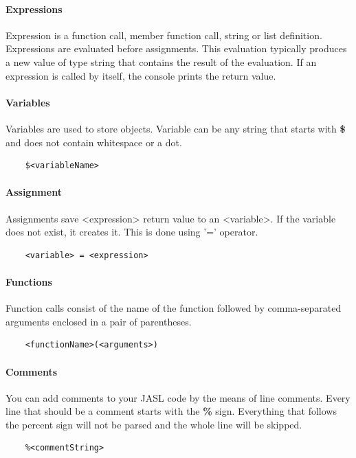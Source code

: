 \documentclass{ctuthesis}
\begin{document}
\paragraph{Expressions}
Expression is a function call, member function call, string or list definition. Expressions are evaluated before assignments. This evaluation typically produces a new value of type string that contains the result of the evaluation. If an expression is called by itself, the console prints the return value.

\paragraph{Variables}
Variables are used to store objects. Variable can be any string that starts with \textbf{\$} and does not contain whitespace or a dot.
\begin{verbatim}
	$<variableName>
\end{verbatim}

\paragraph{Assignment}
Assignments save <expression> return value to an <variable>. If the variable does not exist, it creates it. This is done using '=' operator.
\begin{verbatim}
	<variable> = <expression>
\end{verbatim} 


\paragraph{Functions}
Function calls consist of the name of the function followed by comma-separated arguments enclosed in a pair of parentheses. 
\begin{verbatim}
	<functionName>(<arguments>)
\end{verbatim}

\paragraph{Comments}
You can add comments to your JASL code by the means of line comments. Every line that should be a comment starts with the \textbf{\%} sign. Everything that follows the percent sign will not be parsed and the whole line will be skipped. 
\begin{verbatim}
	%<commentString>
\end{verbatim}
\end{document}

